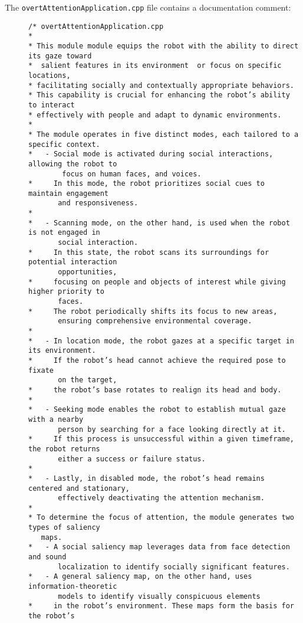 \documentclass{CSSRforAfrica}
\newcommand{\checkboxChecked}{\fbox{\ding{51}}} %
\begin{document}
\noindent The {\small \verb+overtAttentionApplication.cpp+} file contains a documentation comment:

\begin{description}

\item[\checkboxChecked] 
 {\small 
\begin{verbatim}
/* overtAttentionApplication.cpp
*
* This module module equips the robot with the ability to direct its gaze toward
*  salient features in its environment  or focus on specific locations, 
* facilitating socially and contextually appropriate behaviors. 
* This capability is crucial for enhancing the robot’s ability to interact 
* effectively with people and adapt to dynamic environments.
*
* The module operates in five distinct modes, each tailored to a specific context. 
*   - Social mode is activated during social interactions, allowing the robot to 
        focus on human faces, and voices. 
*     In this mode, the robot prioritizes social cues to maintain engagement 
       and responsiveness. 
*
*   - Scanning mode, on the other hand, is used when the robot is not engaged in 
       social interaction. 
*     In this state, the robot scans its surroundings for potential interaction 
       opportunities, 
*     focusing on people and objects of interest while giving higher priority to 
       faces. 
*     The robot periodically shifts its focus to new areas, 
       ensuring comprehensive environmental coverage.
*
*   - In location mode, the robot gazes at a specific target in its environment. 
*     If the robot’s head cannot achieve the required pose to fixate 
       on the target, 
*     the robot’s base rotates to realign its head and body. 
*
*   - Seeking mode enables the robot to establish mutual gaze with a nearby 
       person by searching for a face looking directly at it. 
*     If this process is unsuccessful within a given timeframe, the robot returns 
       either a success or failure status. 
*
*   - Lastly, in disabled mode, the robot’s head remains centered and stationary, 
       effectively deactivating the attention mechanism.
*
* To determine the focus of attention, the module generates two types of saliency 
   maps. 
*   - A social saliency map leverages data from face detection and sound 
       localization to identify socially significant features. 
*   - A general saliency map, on the other hand, uses information-theoretic 
       models to identify visually conspicuous elements 
*     in the robot’s environment. These maps form the basis for the robot’s 

\end{verbatim}}
\end{description}
\end{document}
